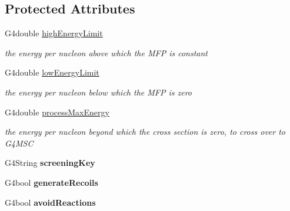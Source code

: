 \subsection*{Protected Attributes}
\begin{DoxyCompactItemize}
\item 
\hypertarget{classG4ScreenedNuclearRecoil_a2851b050a8dd1473dd893737ae0d9c3a}{G4double \hyperlink{classG4ScreenedNuclearRecoil_a2851b050a8dd1473dd893737ae0d9c3a}{high\-Energy\-Limit}}\label{classG4ScreenedNuclearRecoil_a2851b050a8dd1473dd893737ae0d9c3a}

\begin{DoxyCompactList}\small\item\em the energy per nucleon above which the M\-F\-P is constant \end{DoxyCompactList}\item 
\hypertarget{classG4ScreenedNuclearRecoil_aea83086541a85ac4cc0ad44c11e0fc21}{G4double \hyperlink{classG4ScreenedNuclearRecoil_aea83086541a85ac4cc0ad44c11e0fc21}{low\-Energy\-Limit}}\label{classG4ScreenedNuclearRecoil_aea83086541a85ac4cc0ad44c11e0fc21}

\begin{DoxyCompactList}\small\item\em the energy per nucleon below which the M\-F\-P is zero \end{DoxyCompactList}\item 
\hypertarget{classG4ScreenedNuclearRecoil_a1953ae04bf9ef546cc16d07291cd8819}{G4double \hyperlink{classG4ScreenedNuclearRecoil_a1953ae04bf9ef546cc16d07291cd8819}{process\-Max\-Energy}}\label{classG4ScreenedNuclearRecoil_a1953ae04bf9ef546cc16d07291cd8819}

\begin{DoxyCompactList}\small\item\em the energy per nucleon beyond which the cross section is zero, to cross over to G4\-M\-S\-C \end{DoxyCompactList}\item 
\hypertarget{classG4ScreenedNuclearRecoil_a297640f55e7819423579c1123501123d}{G4\-String {\bfseries screening\-Key}}\label{classG4ScreenedNuclearRecoil_a297640f55e7819423579c1123501123d}

\item 
\hypertarget{classG4ScreenedNuclearRecoil_a89431b3d4402b888a5d422e153a45296}{G4bool {\bfseries generate\-Recoils}}\label{classG4ScreenedNuclearRecoil_a89431b3d4402b888a5d422e153a45296}

\item 
\hypertarget{classG4ScreenedNuclearRecoil_a09d5f47fb3f261d777d2dd0a663d199f}{G4bool {\bfseries avoid\-Reactions}}\label{classG4ScreenedNuclearRecoil_a09d5f47fb3f261d777d2dd0a663d199f}


\end{DoxyCompactItemize}
